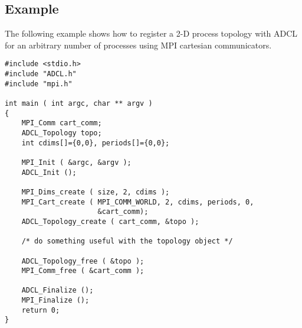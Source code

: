 \subsection{Example}

The following example shows how to register a 2-D process topology with ADCL
for an arbitrary number of processes using MPI cartesian communicators.

\begin{verbatim}
#include <stdio.h>
#include "ADCL.h"
#include "mpi.h"

int main ( int argc, char ** argv ) 
{
    MPI_Comm cart_comm;
    ADCL_Topology topo;
    int cdims[]={0,0}, periods[]={0,0};
   
    MPI_Init ( &argc, &argv );
    ADCL_Init ();
	  
    MPI_Dims_create ( size, 2, cdims );
    MPI_Cart_create ( MPI_COMM_WORLD, 2, cdims, periods, 0, 
                      &cart_comm);
    ADCL_Topology_create ( cart_comm, &topo );

    /* do something useful with the topology object */

    ADCL_Topology_free ( &topo );
    MPI_Comm_free ( &cart_comm );
    
    ADCL_Finalize ();
    MPI_Finalize ();	  
    return 0;
}
\end{verbatim}
